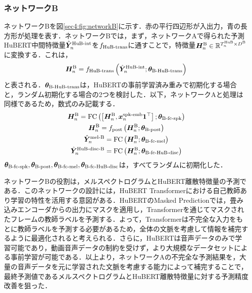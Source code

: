 \subsubsection{ネットワークB}
ネットワークBを図\ref{sec4:fig:networkB}に示す．赤の平行四辺形が入出力，青の長方形が処理を表す．ネットワークBでは，まず，ネットワークAで得られた予測HuBERT中間特徴量$\hat{\bm{Y}}^{\text{HuB-int}}_{n}$を$f_{\text{HuB-trans}}$に通すことで，特徴量$\bm{H}^{\text{B}}_{n} \in \mathbb{R}^{T^{\text{HuB}}_{n} \times D^{\text{B}}}$に変換する．これは，
\begin{equation}
    \bm{H}^{\text{B}}_{n} = f_{\text{HuB-trans}}\left(\hat{\bm{Y}}^{\text{HuB-int}}_{n}; \bm{\theta}_{\text{B-HuB-trans}}\right)
\end{equation}
と表される．$\bm{\theta}_{\text{B-HuB-trans}}$は，HuBERTの事前学習済み重みで初期化する場合と，ランダム初期化する場合の2つを検討した．以下，ネットワークAと処理は同様であるため，数式のみ記載する．
\begin{gather}
    \bm{H}^{\text{B}}_{n} = \text{FC}\left(\left[\bm{H}^{\text{B}}_{n}, \bm{x}^{\text{spk-emb}}_{n} \bm{1}^{\top}\right]; \bm{\theta}_{\text{B-fc-spk}}\right) \\
    \bm{H}^{\text{B}}_{n} = f_{\text{post}}\left(\bm{H}^{\text{B}}_{n}; \bm{\theta}_{\text{B-post}}\right) \\
    \hat{\bm{Y}}^{\text{mel-B}}_{n} = \text{FC}\left(\bm{H}^{\text{B}}_{n}; \bm{\theta}_{\text{B-fc-mel}}\right) \\
    \hat{\bm{Y}}^{\text{HuB-disc-B}}_{n} = \text{FC}\left(\bm{H}^{\text{B}}_{n}; \bm{\theta}_{\text{B-fc-HuB-disc}}\right)
\end{gather}
$\bm{\theta}_{\text{B-fc-spk}}, \bm{\theta}_{\text{B-post}}, \bm{\theta}_{\text{B-fc-mel}}, \bm{\theta}_{\text{B-fc-HuB-disc}}$は，すべてランダムに初期化した．

ネットワークBの役割は，メルスペクトログラムとHuBERT離散特徴量の予測である．このネットワークの設計には，HuBERT Transformerにおける自己教師あり学習の特性を活用する意図がある．HuBERTのMasked Predictionでは，畳み込みエンコーダからの出力にマスクを適用し，Transformerを通じてマスクされたフレームの教師ラベルを予測する．よって，Transformerは不完全な入力をもとに教師ラベルを予測する必要があるため，全体の文脈を考慮して情報を補完するように最適化されると考えられる．さらに，HuBERTは音声データのみで学習可能であり，動画音声データの制約を受けず，より大規模なデータセットによる事前学習が可能である．以上より，ネットワークAの不完全な予測結果を，大量の音声データを元に学習された文脈を考慮する能力によって補完することで，最終予測値であるメルスペクトログラムとHuBERT離散特徴量に対する予測精度改善を狙った．

